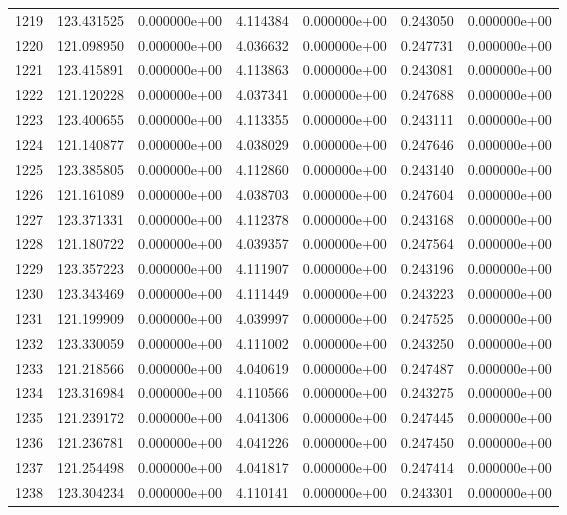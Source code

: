 \begin{tabular}{rrrrrrr}
1219 & 123.431525 &  0.000000e+00 &  4.114384 &  0.000000e+00 &    0.243050 &  0.000000e+00 \\
1220 & 121.098950 &  0.000000e+00 &  4.036632 &  0.000000e+00 &    0.247731 &  0.000000e+00 \\
1221 & 123.415891 &  0.000000e+00 &  4.113863 &  0.000000e+00 &    0.243081 &  0.000000e+00 \\
1222 & 121.120228 &  0.000000e+00 &  4.037341 &  0.000000e+00 &    0.247688 &  0.000000e+00 \\
1223 & 123.400655 &  0.000000e+00 &  4.113355 &  0.000000e+00 &    0.243111 &  0.000000e+00 \\
1224 & 121.140877 &  0.000000e+00 &  4.038029 &  0.000000e+00 &    0.247646 &  0.000000e+00 \\
1225 & 123.385805 &  0.000000e+00 &  4.112860 &  0.000000e+00 &    0.243140 &  0.000000e+00 \\
1226 & 121.161089 &  0.000000e+00 &  4.038703 &  0.000000e+00 &    0.247604 &  0.000000e+00 \\
1227 & 123.371331 &  0.000000e+00 &  4.112378 &  0.000000e+00 &    0.243168 &  0.000000e+00 \\
1228 & 121.180722 &  0.000000e+00 &  4.039357 &  0.000000e+00 &    0.247564 &  0.000000e+00 \\
1229 & 123.357223 &  0.000000e+00 &  4.111907 &  0.000000e+00 &    0.243196 &  0.000000e+00 \\
1230 & 123.343469 &  0.000000e+00 &  4.111449 &  0.000000e+00 &    0.243223 &  0.000000e+00 \\
1231 & 121.199909 &  0.000000e+00 &  4.039997 &  0.000000e+00 &    0.247525 &  0.000000e+00 \\
1232 & 123.330059 &  0.000000e+00 &  4.111002 &  0.000000e+00 &    0.243250 &  0.000000e+00 \\
1233 & 121.218566 &  0.000000e+00 &  4.040619 &  0.000000e+00 &    0.247487 &  0.000000e+00 \\
1234 & 123.316984 &  0.000000e+00 &  4.110566 &  0.000000e+00 &    0.243275 &  0.000000e+00 \\
1235 & 121.239172 &  0.000000e+00 &  4.041306 &  0.000000e+00 &    0.247445 &  0.000000e+00 \\
1236 & 121.236781 &  0.000000e+00 &  4.041226 &  0.000000e+00 &    0.247450 &  0.000000e+00 \\
1237 & 121.254498 &  0.000000e+00 &  4.041817 &  0.000000e+00 &    0.247414 &  0.000000e+00 \\
1238 & 123.304234 &  0.000000e+00 &  4.110141 &  0.000000e+00 &    0.243301 &  0.000000e+00 \\

\end{tabular}
